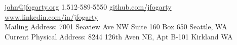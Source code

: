 \documentclass[10pt,a4paper]{article}
\begin{document}
\sloppy  %



\nobreakvspace{0.3em}  %

\noindent\href{mailto:john.at.jfogarty.dot.org}{john\mbox{}@\mbox{}jfogarty.org}\sbull
\textsmaller{+}1.512-589-5550\sbull
\href{https://github.com/jfogarty}{github.com/jfogarty}
\sbull
\href{http://www.linkedin.com/in/jfogarty}{www.linkedin.com/in/jfogarty}
\\
Mailing Address: 7001 Seaview Ave NW\sbull
Suite 160\sbull
Box 650\sbull
Seattle, WA
\\
Current Physical Address:
8244 126th Aven NE, Apt B-101\sbull
\hspace*{1mm}Kirkland WA

\spacedhrule{0.9em}{-0.4em}  %

\end{document}
